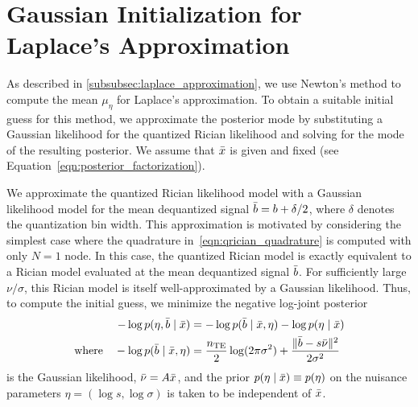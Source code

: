 \section{Gaussian Initialization for Laplace's Approximation}\label{sec:apx:gaussian_approximation}

As described in \cref{subsubsec:laplace_approximation}, we use Newton's method to compute the mean $\mu_{\eta}$ for Laplace's approximation.
To obtain a suitable initial guess for this method, we approximate the posterior mode by substituting a Gaussian likelihood for the quantized Rician likelihood and solving for the mode of the resulting posterior.
We assume that $\bar{x}$ is given and fixed (see Equation~\eqref{eqn:posterior_factorization}).

We approximate the quantized Rician likelihood model with a Gaussian likelihood model for the mean dequantized signal $\bar{b} = b + \delta / 2$, where $\delta$ denotes the quantization bin width.
This approximation is motivated by considering the simplest case where the quadrature in~\eqref{eqn:qrician_quadrature} is computed with only $N=1$ node.
In this case, the quantized Rician model is exactly equivalent to a Rician model evaluated at the mean dequantized signal $\bar{b}$.
For sufficiently large $\nu/\sigma$, this Rician model is itself well-approximated by a Gaussian likelihood.
Thus, to compute the initial guess, we minimize the negative log-joint posterior
\begin{align}
    -\log p(\eta, \bar{b} \mid \bar{x}) & = -\log p(\bar{b} \mid \bar{x}, \eta) - \log p(\eta \mid \bar{x}) \label{eqn:gauss_approx_neg_log_joint}                \\
    \text{where} \quad
    -\log p(\bar{b} \mid \bar{x}, \eta) & = \frac{n_{\mathrm{TE}}}{2} \log(2\pi\sigma^2) + \frac{\lVert \bar{b} - s\bar{\nu} \rVert^2}{2\sigma^2} \label{eqn:gauss_approx_likelihood}
\end{align}
is the Gaussian likelihood, $\bar{\nu} = A \bar{x}$, and the prior $p(\eta \mid \bar{x}) \equiv p(\eta)$ on the nuisance parameters $\eta = (\log s, \log \sigma)$ is taken to be independent of $\bar{x}$.

